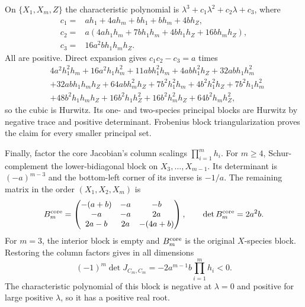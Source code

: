 On $\{X_1,X_m,Z\}$ the characteristic polynomial is
$\lambda^3+c_1\lambda^2+c_2\lambda+c_3$, where
\begin{align*}
c_1={}&ah_1+4ah_m+bh_1+bh_m+4bh_Z,\\
c_2={}&a(4ah_1h_m+7bh_1h_m+4bh_1h_Z+16bh_mh_Z),\\
c_3={}&16a^2bh_1h_mh_Z.
\end{align*}
All are positive.  Direct expansion gives $c_1c_2-c_3=a$ times
\begin{align*}
&4a^2h_1^2h_m+16a^2h_1h_m^2+11abh_1^2h_m+4abh_1^2h_Z
+32abh_1h_m^2\\
&+32abh_1h_mh_Z+64abh_m^2h_Z+7b^2h_1^2h_m+4b^2h_1^2h_Z
+7b^2h_1h_m^2\\
&+48b^2h_1h_mh_Z+16b^2h_1h_Z^2+16b^2h_m^2h_Z
+64b^2h_mh_Z^2,
\end{align*}
so the cubic is Hurwitz.  Its one- and two-species principal blocks are
Hurwitz by negative trace and positive determinant.  Frobenius block
triangularization proves the claim for every smaller principal set.

Finally, factor the core Jacobian's column scalings $\prod_{i=1}^m h_i$.
For $m\ge4$, Schur-complement the lower-bidiagonal block on
$X_3,\ldots,X_{m-1}$.  Its determinant is $(-a)^{m-3}$ and the bottom-left
corner of its inverse is $-1/a$.  The remaining matrix in the order
$(X_1,X_2,X_m)$ is
\[
B_m^{\rm core}=\begin{pmatrix}
-(a+b)&-a&-b\\
-a&-a&2a\\
2a-b&2a&-(4a+b)
\end{pmatrix},
\qquad \det B_m^{\rm core}=2a^2b.
\]
For $m=3$, the interior block is empty and $B_m^{\rm core}$ is the original
$X$-species block.  Restoring the column factors gives in all dimensions
\[
(-1)^m\det J_{C_m,C_m}
=-2a^{m-1}b\prod_{i=1}^m h_i<0.
\]
The characteristic polynomial of this block is negative at $\lambda=0$ and
positive for large positive $\lambda$, so it has a positive real root.
